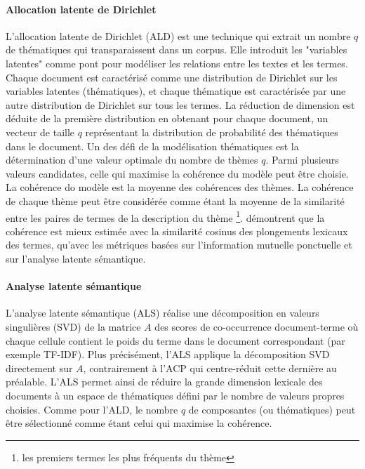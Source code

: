 \paragraph[LDA]{Allocation latente de Dirichlet}
L'allocation latente de Dirichlet (ALD) \citep{blei2003lda} est une technique qui extrait un nombre $q$ de thématiques qui transparaissent dans un corpus. Elle introduit les "variables latentes" comme pont pour modéliser les relations entre les textes et les termes. Chaque document est caractérisé comme une distribution de Dirichlet sur les variables latentes (thématiques), et chaque thématique est caractérisée par une autre distribution de Dirichlet sur tous les termes. La réduction de dimension est déduite de la première distribution en obtenant pour chaque document, un vecteur de taille $q$ représentant la distribution de probabilité des thématiques dans le document. Un des défi de la modélisation thématiques est la détermination d'une valeur optimale du nombre de thèmes $q$. Parmi plusieurs valeurs candidates, celle qui maximise la cohérence du modèle peut être choisie. La cohérence do modèle est la moyenne des  cohérences des thèmes. La cohérence de chaque thème peut être considérée comme étant la moyenne de la similarité entre les paires de termes de la description du thème \footnote{les premiers termes les plus fréquents du thème}. \citet{fang2016w2v_for_topiccoherence} démontrent que la cohérence est mieux estimée avec la similarité cosinus des plongements lexicaux des termes, qu'avec les métriques basées sur l'information mutuelle ponctuelle et sur l'analyse latente sémantique. %

\paragraph[LSA]{Analyse latente sémantique}
L'analyse latente sémantique (ALS) \citep{dumais1988LSI, deerwester1990indexingbyLSA} réalise une décomposition en valeurs singulières (SVD) de la matrice $A$ des scores de co-occurrence document-terme où chaque cellule contient le poids du terme dans le document correspondant (par exemple TF-IDF). Plus précisément, l'ALS applique la décomposition SVD directement sur $A$, contrairement à l'ACP qui centre-réduit cette dernière au préalable. L'ALS permet ainsi de réduire la grande dimension lexicale des documents à un espace de thématiques défini par le nombre de valeurs propres choisies. Comme pour l'ALD, le nombre $q$ de composantes (ou thématiques) peut être sélectionné comme étant celui qui  maximise la cohérence. 


